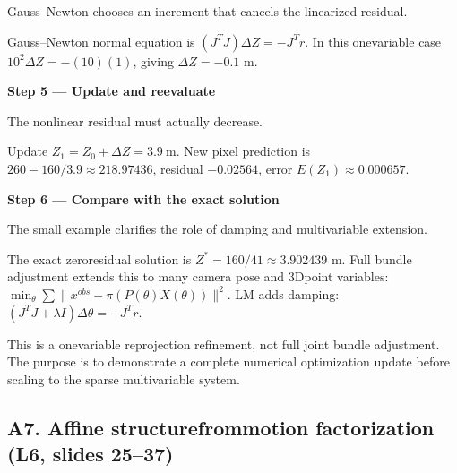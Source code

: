 \documentclass[letterpaper,11pt,english,openany,oneside]{jupyterBook}
\begin{document}
\sphinxAtStartPar
{} Gauss–Newton chooses an increment that cancels the linearized residual.

\sphinxAtStartPar
Gauss–Newton normal equation is {\color{QuizMathBlue} \((J^TJ)\Delta Z=-J^Tr\)}. In this one\sphinxhyphen{}variable case {\color{QuizMathBlue} \(10^2\Delta Z=-(10)(1)\)}, giving {\color{QuizMathBlue} \(\Delta Z=-0.1\)} m.

\par

\par\medskip{}
{\color{QuizStepRed}\bfseries Step 5 — Update and re\sphinxhyphen{}evaluate}\par\smallskip

\sphinxAtStartPar
{} The nonlinear residual must actually decrease.

\sphinxAtStartPar
Update {\color{QuizMathBlue} \(\boxed{Z_1=Z_0+\Delta Z=3.9\ \mathrm m}\)}. New pixel prediction is {\color{QuizMathBlue} \(260-160/3.9\approx218.97436\)}, residual {\color{QuizMathBlue} \(-0.02564\)}, error {\color{QuizMathBlue} \(E(Z_1)\approx0.000657\)}.

\par

\par\medskip{}
{\color{QuizStepRed}\bfseries Step 6 — Compare with the exact solution}\par\smallskip

\sphinxAtStartPar
{} The small example clarifies the role of damping and multivariable extension.

\sphinxAtStartPar
The exact zero\sphinxhyphen{}residual solution is {\color{QuizMathBlue} \(Z^*=160/41\approx3.902439\)} m. Full bundle adjustment extends this to many camera pose and 3D\sphinxhyphen{}point variables: {\color{QuizMathBlue} \(\min_\theta\sum\|x^{obs}-\pi(P(\theta)X(\theta))\|^2\)}. LM adds damping: {\color{QuizMathBlue} \((J^TJ+\lambda I)\Delta\theta=-J^Tr\)}.

\par

\sphinxAtStartPar
{} This is a one\sphinxhyphen{}variable reprojection refinement, not full joint bundle adjustment. The purpose is to demonstrate a complete numerical optimization update before scaling to the sparse multivariable system.


\subsection{A7. Affine structure\sphinxhyphen{}from\sphinxhyphen{}motion factorization (L6, slides 25–37)}
\label{\detokenize{lectures/lecture06/quiz-workbook:a7-affine-structure-from-motion-factorization-l6-slides-2537}}\label{\detokenize{lectures/lecture06/quiz-workbook:quiz-source-a7}}
\sphinxAtStartPar
{}
\end{document}
